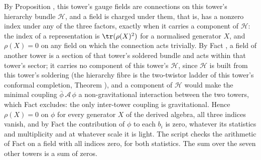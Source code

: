 By Proposition , this tower's gauge fields are connections on this tower's hierarchy bundle $\mathcal{H}$, and a field is charged under them, that is, has a nonzero index under any of the three factors, exactly when it carries a component of $\mathcal{H}$: the index of a representation is $\tr(\rho(X)^{2})$ for a normalised generator $X$, and $\rho(X) = 0$ on any field on which the connection acts trivially. By Fact , a field of another tower is a section of that tower's soldered bundle and acts within that tower's sector; it carries no component of this tower's $\mathcal{H}$, since $\mathcal{H}$ is built from this tower's soldering (the hierarchy fibre is the two-twistor ladder of this tower's conformal completion, Theorem ), and a component of $\mathcal{H}$ would make the minimal coupling $\bar{\phi}\,\mathcal{A}\,\phi$ a non-gravitational interaction between the two towers, which Fact  excludes: the only inter-tower coupling is gravitational. Hence $\rho(X) = 0$ on $\phi$ for every generator $X$ of the derived algebra, all three indices vanish, and by Fact  the contribution of $\phi$ to each $b_{i}$ is zero, whatever its statistics and multiplicity and at whatever scale it is light. The script checks the arithmetic of Fact  on a field with all indices zero, for both statistics. The sum over the seven other towers is a sum of zeros.
